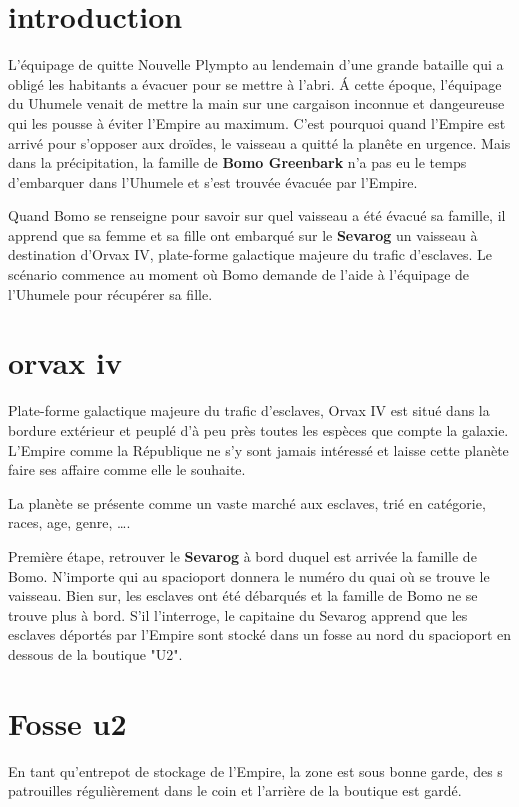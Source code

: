 \documentclass{jdrp}
\begin{document}
	\twocolumn

	\section{introduction}
	L’équipage de  quitte Nouvelle Plympto au lendemain d’une grande bataille qui a obligé les habitants a évacuer pour se mettre à l’abri. \'A cette époque, l’équipage du Uhumele venait de mettre la main sur une cargaison inconnue et dangeureuse qui les pousse à éviter l’Empire au maximum. C’est pourquoi quand l’Empire est arrivé pour s’opposer aux droïdes, le vaisseau a quitté la planête en urgence. Mais dans la précipitation, la famille de \textbf{Bomo Greenbark} n’a pas eu le temps d’embarquer dans l’Uhumele et s'est trouvée évacuée par l’Empire. 

	Quand Bomo se renseigne pour savoir sur quel vaisseau a été évacué sa famille, il apprend que sa femme et sa fille ont embarqué sur le \textbf{Sevarog} un vaisseau à destination d’Orvax IV, plate-forme galactique majeure du trafic d’esclaves. Le scénario commence au moment où Bomo demande de l’aide à l’équipage de l’Uhumele pour récupérer sa fille.

	\section{orvax iv}
	Plate-forme galactique majeure du trafic d’esclaves, Orvax IV est situé dans la bordure extérieur et peuplé d’à peu près toutes les espèces que compte la galaxie. L’Empire comme la République ne s’y sont jamais intéressé et laisse cette planète faire ses affaire comme elle le souhaite.

	La planète se présente comme un vaste marché aux esclaves, trié en catégorie, races, age, genre, \ldots.

	Première étape, retrouver le \textbf{Sevarog} à bord duquel est arrivée la famille de Bomo. N’importe qui au spacioport donnera le numéro du quai où se trouve le vaisseau. Bien sur, les esclaves ont été débarqués et la famille de Bomo ne se trouve plus à bord. S’il l'interroge, le capitaine du Sevarog apprend que les esclaves déportés par l’Empire sont stocké dans un fosse au nord du spacioport en dessous de la boutique "U2".

	\section{Fosse u2}
	En tant qu’entrepot de stockage de l’Empire, la zone est sous bonne garde, des s patrouilles régulièrement dans le coin et l’arrière de la boutique est gardé.
\end{document}
